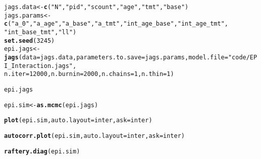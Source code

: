 \documentclass[12pt,letterpaper,oneside]{article}\usepackage{graphicx, color}
\makeatletter
\newcommand{\hlfunctioncall}[1]{\textcolor[rgb]{0.501960784313725,0,0.329411764705882}{\textbf{#1}}}%
\newcommand{\hlstring}[1]{\textcolor[rgb]{0.6,0.6,1}{#1}}%
\newenvironment{kframe}{%
 \def\at@end@of@kframe{}%
 \ifinner\ifhmode%
  \def\at@end@of@kframe{\end{minipage}}%
  \begin{minipage}{\columnwidth}%
 \fi\fi%
 \def\FrameCommand##1{\hskip\@totalleftmargin \hskip-\fboxsep
 \colorbox{shadecolor}{##1}\hskip-\fboxsep
     \hskip-\linewidth \hskip-\@totalleftmargin \hskip\columnwidth}%
 \MakeFramed {\advance\hsize-\width
   \@totalleftmargin\z@ \linewidth\hsize
   \@setminipage}}%
 {\par\unskip\endMakeFramed%
 \at@end@of@kframe}
\newenvironment{knitrout}{}{} %
\makeatother
\begin{document}
\begin{knitrout}\scriptsize
{}\color{fgcolor}\begin{kframe}
\begin{alltt}
jags.data <- \hlfunctioncall{c}(\hlstring{"N"}, \hlstring{"pid"}, \hlstring{"scount"}, \hlstring{"age"}, \hlstring{"tmt"}, \hlstring{"base"})
jags.params <- \hlfunctioncall{c}(\hlstring{"a_0"}, \hlstring{"a_age"}, \hlstring{"a_base"}, \hlstring{"a_tmt"}, \hlstring{"int_age_base"}, \hlstring{"int_age_tmt"}, 
    \hlstring{"int_base_tmt"}, \hlstring{"ll"})
\hlfunctioncall{set.seed}(3245)
epi.jags <- \hlfunctioncall{jags}(data = jags.data, parameters.to.save = jags.params, model.file = \hlstring{"code/EPI_Interaction.jags"}, 
    n.iter = 12000, n.burnin = 2000, n.chains = 1, n.thin = 1)
\end{alltt}


{\ttfamily\noindent\itshape\color{messagecolor}{\#\# module glm loaded}}

{\ttfamily\noindent\bfseries\color{errorcolor}{\#\# Error: \\\#\# Error parsing model file:\\\#\# syntax error on line 6 near """}}\begin{alltt}
epi.jags
\end{alltt}


{\ttfamily\noindent\bfseries\color{errorcolor}{\#\# Error: object 'epi.jags' not found}}\end{kframe}
\end{knitrout}

\begin{knitrout}\scriptsize
{}\color{fgcolor}\begin{kframe}
\begin{alltt}
epi.sim <- \hlfunctioncall{as.mcmc}(epi.jags)
\end{alltt}


{\ttfamily\noindent\bfseries\color{errorcolor}{\#\# Error: object 'epi.jags' not found}}\begin{alltt}
\hlfunctioncall{plot}(epi.sim, auto.layout = inter, ask = inter)
\end{alltt}


{\ttfamily\noindent\bfseries\color{errorcolor}{\#\# Error: object 'epi.sim' not found}}\begin{alltt}
\hlfunctioncall{autocorr.plot}(epi.sim, auto.layout = inter, ask = inter)
\end{alltt}


{\ttfamily\noindent\bfseries\color{errorcolor}{\#\# Error: object 'inter' not found}}\begin{alltt}
\hlfunctioncall{raftery.diag}(epi.sim)
\end{alltt}


{\ttfamily\noindent\bfseries\color{errorcolor}{\#\# Error: object 'epi.sim' not found}}\end{kframe}
\end{knitrout}
\end{document}
